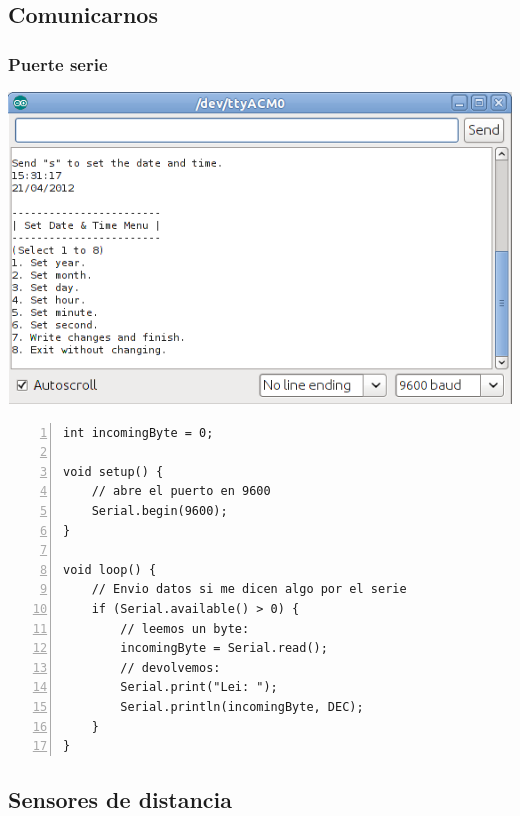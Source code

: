 \documentclass[compress]{beamer}
\begin{document}
\subsection{Comunicarnos}
\begin{frame}[fragile]
 \frametitle{Puerte serie}

\begin{center}
 \includegraphics[height=0.4\textheight]{./img/serial.png}
\end{center}

\begin{Verbatim}[formatcom=\color{red},fontseries=b, numbers=left,numbersep=3pt,fontsize=\tiny]
int incomingByte = 0;

void setup() {
    // abre el puerto en 9600
    Serial.begin(9600);
}

void loop() {
    // Envio datos si me dicen algo por el serie
    if (Serial.available() > 0) {
        // leemos un byte:
        incomingByte = Serial.read();
        // devolvemos:
        Serial.print("Lei: ");
        Serial.println(incomingByte, DEC);
    }
}
\end{Verbatim}
\end{frame}

\subsection{Sensores de distancia}
\end{document}
